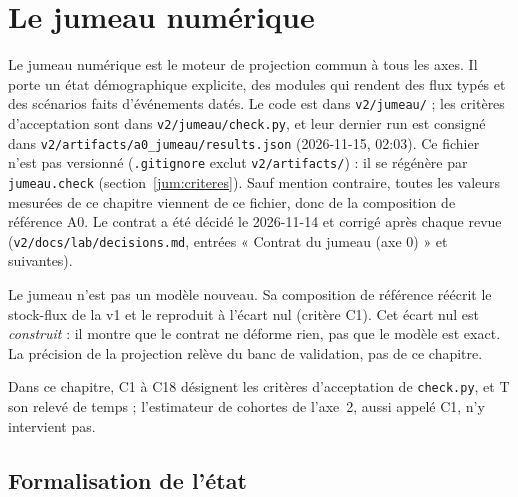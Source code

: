 \begingroup\sloppy\setlength{\emergencystretch}{3em}%

\section{Le jumeau numérique}\label{sec:jumeau-ref}\label{jum:sec}

Le jumeau numérique est le moteur de projection commun à tous les axes. Il porte un état démographique
explicite, des modules qui rendent des flux typés et des scénarios faits d'événements datés. Le code est dans
\texttt{v2/jumeau/} ; les critères d'acceptation sont dans \texttt{v2/jumeau/check.py}, et leur dernier run est
consigné dans \texttt{v2/artifacts/a0\_jumeau/results.json} (2026-11-15, 02:03). Ce fichier n'est pas versionné
(\texttt{.gitignore} exclut \texttt{v2/artifacts/}) : il se régénère par \texttt{jumeau.check}
(section~\ref{jum:criteres}). Sauf mention contraire, toutes les valeurs mesurées de ce chapitre viennent de ce
fichier, donc de la composition de référence A0. Le contrat a été décidé le 2026-11-14 et corrigé
après chaque revue (\texttt{v2/docs/lab/decisions.md}, entrées « Contrat du jumeau (axe 0) » et suivantes).

Le jumeau n'est pas un modèle nouveau. Sa composition de référence réécrit le stock-flux de la v1 et le
reproduit à l'écart nul (critère C1). Cet écart nul est \emph{construit} : il montre que le contrat ne déforme
rien, pas que le modèle est exact. La précision de la projection relève du banc de validation, pas de ce
chapitre.

Dans ce chapitre, C1 à C18 désignent les critères d'acceptation de \texttt{check.py}, et T son relevé de temps ; l'estimateur de
cohortes de l'axe~2, aussi appelé C1, n'y intervient pas.

\subsection{Formalisation de l'état}\label{jum:etat}

